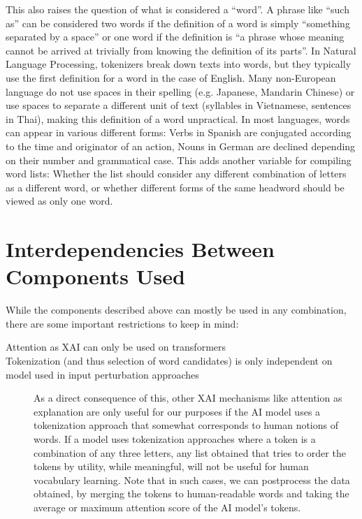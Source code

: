 \begin{description}
	      This also raises the question of what is considered a “word”.
	      A phrase like “such as” can be considered two words if the definition of a word is simply “something separated by a space” or one word if the definition is “a phrase whose meaning cannot be arrived at trivially from knowing the definition of its parts”.
	      In Natural Language Processing, tokenizers break down texts into words, but they typically use the first definition for a word in the case of English.
	      Many non-European language do not use spaces in their spelling (e.g. Japanese, Mandarin Chinese) or use spaces to separate a different unit of text (syllables in Vietnamese, sentences in Thai), making this definition of a word unpractical.
	      In most languages, words can appear in various different forms: Verbs in Spanish are conjugated according to the time and originator of an action, Nouns in German are declined depending on their number and grammatical case.
	      This adds another variable for compiling word lists: Whether the list should consider any different combination of letters as a different word, or whether different forms of the same headword should be viewed as only one word.
\end{description}


\section{Interdependencies Between Components Used}

While the components described above can mostly be used in any combination, there are some important restrictions to keep in mind:

\begin{description}
	\item[Attention as XAI can only be used on transformers]
	\item[Tokenization (and thus selection of word candidates) is only independent on model used in input perturbation approaches]
	      As a direct consequence of this, other XAI mechanisms like attention as explanation are only useful for our purposes if the AI model uses a tokenization approach that somewhat corresponds to human notions of words.
	      If a model uses tokenization approaches where a token is a combination of any three letters, any list obtained that tries to order the tokens by utility, while meaningful, will not be useful for human vocabulary learning.
	      Note that in such cases, we can postprocess the data obtained, by merging the tokens to human-readable words and taking the average or maximum attention score of the AI model's tokens.
	\item[]
\end{description}




